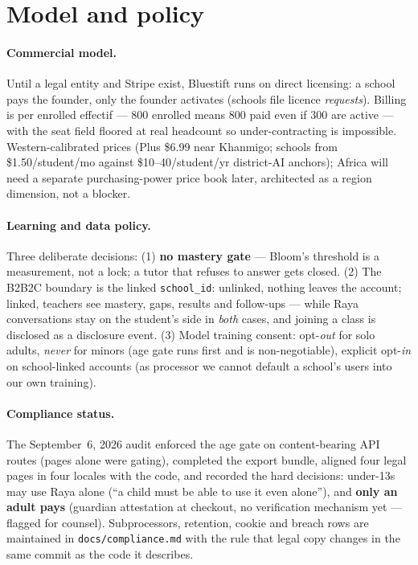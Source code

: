 \documentclass[11pt,a4paper]{article}
\let\oldsection\section
\renewcommand{\section}{\clearpage\oldsection}
\begin{document}
\section{Model and policy}
\label{sec:model}
\label{sec:policy}

\paragraph{Commercial model.} Until a legal entity and Stripe exist, Bluestift
runs on direct licensing: a school pays the founder, only the founder
activates (schools file licence \emph{requests}). Billing is per enrolled
effectif --- 800 enrolled means 800 paid even if 300 are active --- with the
seat field floored at real headcount so under-contracting is impossible.
Western-calibrated prices (Plus \$6.99 near Khanmigo; schools from
\$1.50/student/mo against \$10--40/student/yr district-AI anchors); Africa
will need a separate purchasing-power price book later, architected as a
region dimension, not a blocker.

\paragraph{Learning and data policy.} Three deliberate decisions: (1) \textbf{no
mastery gate} --- Bloom's threshold is a measurement, not a lock; a tutor that
refuses to answer gets closed. (2) The B2B2C boundary is the linked
\texttt{school\_id}: unlinked, nothing leaves the account; linked, teachers
see mastery, gaps, results and follow-ups --- while Raya conversations stay on
the student's side in \emph{both} cases, and joining a class is disclosed as a
disclosure event. (3) Model training consent: opt-\emph{out} for solo adults,
\emph{never} for minors (age gate runs first and is non-negotiable), explicit
opt-\emph{in} on school-linked accounts (as processor we cannot default a
school's users into our own training).

\paragraph{Compliance status.} The September~6, 2026 audit enforced the age
gate on content-bearing API routes (pages alone were gating), completed the
export bundle, aligned four legal pages in four locales with the code, and
recorded the hard decisions: under-13s may use Raya alone (``a child must be
able to use it even alone''), and \textbf{only an adult pays} (guardian
attestation at checkout, no verification mechanism yet --- flagged for
counsel). Subprocessors, retention, cookie and breach rows are maintained in
\texttt{docs/compliance.md} with the rule that legal copy changes in the same
commit as the code it describes.
\end{document}
